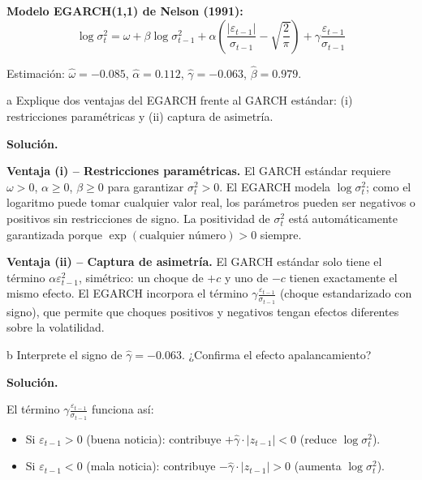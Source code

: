 \documentclass[11pt,a4paper]{article}
\newcommand{\sigmat}{\sigma^2_t}
\newcommand{\eps}{\varepsilon}
\begin{document}
\textbf{Modelo EGARCH(1,1) de Nelson (1991):}
\[
\log\sigmat = \omega + \beta\log\sigma^2_{t-1} + \alpha\!\left(\frac{|\eps_{t-1}|}{\sigma_{t-1}} - \sqrt{\frac{2}{\pi}}\right) + \gamma\frac{\eps_{t-1}}{\sigma_{t-1}}
\]

Estimación: $\hat{\omega}=-0.085$, $\hat{\alpha}=0.112$, $\hat{\gamma}=-0.063$, $\hat{\beta}=0.979$.

\begin{cajaInciso}{a}
Explique dos ventajas del EGARCH frente al GARCH estándar: (i) restricciones paramétricas y (ii) captura de asimetría.
\end{cajaInciso}

\textbf{Solución.}

\textbf{Ventaja (i) -- Restricciones paramétricas.} El GARCH estándar requiere $\omega>0$, $\alpha\geq 0$, $\beta\geq 0$ para garantizar $\sigmat>0$. El EGARCH modela $\log\sigmat$; como el logaritmo puede tomar cualquier valor real, los parámetros pueden ser negativos o positivos sin restricciones de signo. La positividad de $\sigmat$ está automáticamente garantizada porque $\exp(\text{cualquier número})>0$ siempre.

\textbf{Ventaja (ii) -- Captura de asimetría.} El GARCH estándar solo tiene el término $\alpha\eps_{t-1}^2$, simétrico: un choque de $+c$ y uno de $-c$ tienen exactamente el mismo efecto. El EGARCH incorpora el término $\gamma\frac{\eps_{t-1}}{\sigma_{t-1}}$ (choque estandarizado con signo), que permite que choques positivos y negativos tengan efectos diferentes sobre la volatilidad.

\begin{cajaInciso}{b}
Interprete el signo de $\hat{\gamma} = -0.063$. ¿Confirma el efecto apalancamiento?
\end{cajaInciso}

\textbf{Solución.}

El término $\gamma\frac{\eps_{t-1}}{\sigma_{t-1}}$ funciona así:
\begin{itemize}[leftmargin=*]
  \item Si $\eps_{t-1}>0$ (buena noticia): contribuye $+\hat{\gamma}\cdot|z_{t-1}|<0$ (reduce $\log\sigmat$).
  \item Si $\eps_{t-1}<0$ (mala noticia): contribuye $-\hat{\gamma}\cdot|z_{t-1}|>0$ (aumenta $\log\sigmat$).
\end{itemize}
\end{document}
